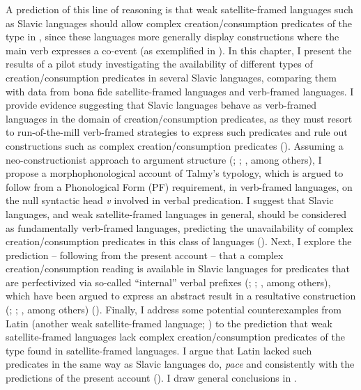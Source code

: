 \documentclass[output=paper,colorlinks,citecolor=brown]{langscibook}
\begin{document}
\largerpage
A prediction of this line of reasoning is that weak satellite-framed languages such as Slavic languages should allow complex creation/consumption predicates of the type in , since these languages more generally display constructions where the main verb expresses a co-event (as exemplified in ). In this chapter, I present the results of a pilot study investigating the availability of different types of creation/consumption predicates in several Slavic languages, comparing them with data from bona fide satellite-framed languages and verb-framed languages. I provide evidence suggesting that Slavic languages behave as verb-framed languages in the domain of creation/consumption predicates, as they must resort to run-of-the-mill verb-framed strategies to express such predicates and rule out constructions such as complex creation/consumption predicates (). Assuming a neo-constructionist approach to argument structure (\citealt{Mateu2002}; \citealt{Borer2005b}; \citealt{MateuAndAcedo-Matellan2012}, among others), I propose a morphophonological account of Talmy's typology, which is argued to follow from a Phonological Form (PF) requirement, in verb-framed languages, on the null syntactic head \textit{v} involved in verbal predication. I suggest that Slavic languages, and weak satellite-framed languages in general, should be considered as fundamentally verb-framed languages, predicting the unavailability of complex creation/consumption predicates in this class of languages (). Next, I explore the prediction -- following from the present account -- that a complex creation/consumption reading is available in Slavic languages for predicates that are perfectivized via so-called “internal” verbal prefixes (\citealt{big:Svenonius2004}; \citealt{big:Borik2006}; \citealt{big:Gehrke2008}, among others), which have been argued to express an abstract result in a resultative construction (\citealt{big:Gehrke2008}; \citealt{Acedo-Matellan2016}; \citealt{big:Kwapiszewski2022}, among others) (). Finally, I address some potential counterexamples from Latin (another weak satellite-framed language; \citealt{Acedo-Matellan2016}) to the prediction that weak satellite-framed languages lack complex creation/consumption predicates of the type found in satellite-framed languages. I argue that Latin lacked such predicates in the same way as Slavic languages do, \textit{pace} \citet{Acedo-Matellan2016} and consistently with the predictions of the present account (). I draw general conclusions in .
\end{document}
